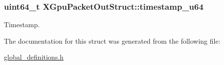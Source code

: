 \subsubsection[{\texorpdfstring{timestamp\+\_\+u64}{timestamp_u64}}]{\setlength{\rightskip}{0pt plus 5cm}uint64\+\_\+t X\+Gpu\+Packet\+Out\+Struct\+::timestamp\+\_\+u64}\hypertarget{struct_x_gpu_packet_out_struct_a321383b4aab7bfaa393174230f0aef99}{}\label{struct_x_gpu_packet_out_struct_a321383b4aab7bfaa393174230f0aef99}
Timestamp. 

The documentation for this struct was generated from the following file\+:\begin{DoxyCompactItemize}
\item 
\hyperlink{global__definitions_8h}{global\+\_\+definitions.\+h}\end{DoxyCompactItemize}
